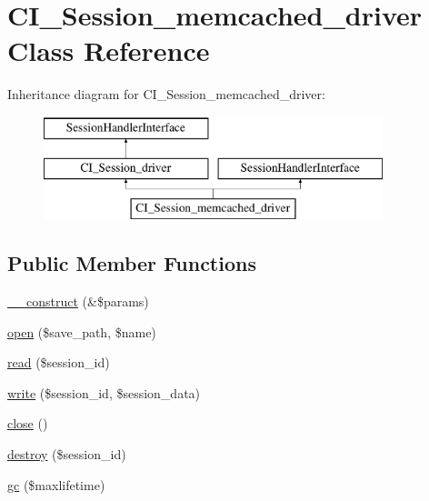\hypertarget{class_c_i___session__memcached__driver}{}\section{C\+I\+\_\+\+Session\+\_\+memcached\+\_\+driver Class Reference}
\label{class_c_i___session__memcached__driver}
Inheritance diagram for C\+I\+\_\+\+Session\+\_\+memcached\+\_\+driver\+:\begin{figure}[H]
\begin{center}
\leavevmode
\includegraphics[height=3.000000cm]{class_c_i___session__memcached__driver}
\end{center}
\end{figure}
\subsection*{Public Member Functions}
\begin{DoxyCompactItemize}
\item 
\hyperlink{class_c_i___session__memcached__driver_ac1669c73d53d6f16cf5459a1e84d39c8}{\+\_\+\+\_\+construct} (\&\$params)
\item 
\hyperlink{class_c_i___session__memcached__driver_a614b5cf3840833913c7a73260ed28e02}{open} (\$save\+\_\+path, \$name)
\item 
\hyperlink{class_c_i___session__memcached__driver_a5bbf84ebf657be4eaccc0582377c76bf}{read} (\$session\+\_\+id)
\item 
\hyperlink{class_c_i___session__memcached__driver_ad9d124885be93668f1dbf6aace5964f5}{write} (\$session\+\_\+id, \$session\+\_\+data)
\item 
\hyperlink{class_c_i___session__memcached__driver_aa69c8bf1f1dcf4e72552efff1fe3e87e}{close} ()
\item 
\hyperlink{class_c_i___session__memcached__driver_aaec5812f6b4eb6835f88d3baa06a002a}{destroy} (\$session\+\_\+id)
\item 
\hyperlink{class_c_i___session__memcached__driver_a57aff7ee0656d8aa75d545fb8b3ae35d}{gc} (\$maxlifetime)
\end{DoxyCompactItemize}
